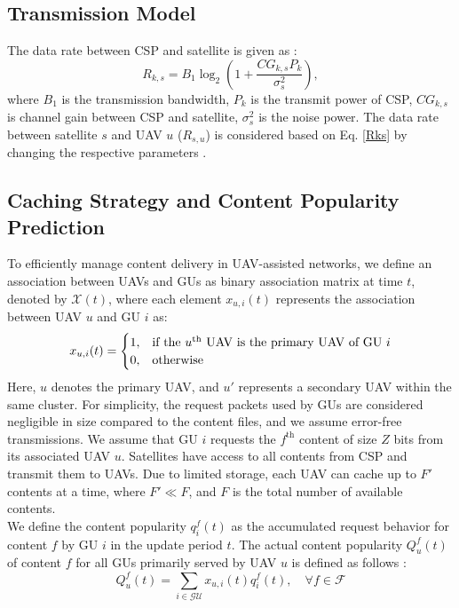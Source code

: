 \documentclass[journal]{IEEEtran}
\begin{document}
\subsection{Transmission Model}
The data rate between CSP and satellite is given as \cite{10297374}:
\begin{equation}
    R_{k,s} = B_1 \log_2\left(1 + \frac{CG_{k,s}P_{k}}{\sigma^2_s}\right), \label{Rks}
\end{equation}
where $B_1$ is the transmission bandwidth, $P_{k}$ is the transmit power of CSP, $CG_{k,s}$ is channel gain between CSP and satellite, $\sigma^2_s$ is the noise power.
The data rate between satellite $s$ and UAV $u$ ($R_{s,u}$)
is considered based on Eq. \eqref{Rks} by changing the respective parameters \cite{10297374}.

\subsection{Caching Strategy and Content Popularity Prediction}

To efficiently manage content delivery in UAV-assisted networks, we define an association between UAVs and GUs as binary association matrix at time $t$, denoted by \textbf{$\mathcal{X}(t)$},  where each element \( x_{u,i}(t) \) represents the association  between UAV \( u \) and GU \( i \) as:
\begin{equation}
\small
x_{u,i}(t) = 
\begin{cases}
1, & \text{if the $u^{\text{th}}$ UAV is the primary UAV of GU $i$} \\
0, & \text{otherwise}
\end{cases}
\end{equation}
Here, $u$ denotes the primary UAV, and $u'$ represents a secondary UAV within the same cluster. For simplicity, the request packets used by GUs are considered negligible in size compared to the content files, and we assume error-free transmissions.
We assume that GU \( i \) requests the \( f^{\text{th}} \) content of size \( Z \) bits from its associated UAV \( u \). Satellites have access to all contents from CSP and transmit them to UAVs. Due to limited storage, each UAV can cache up to \( F' \) contents at a time, where \( F' \ll F \), and \( F \) is the total number of available contents.\\
We define the content popularity \( q_{i}^{f}(t) \) as the accumulated request behavior for content \( f \) by GU \( i \) in the update period \( t \). The actual content popularity \( Q^{f}_{u}(t) \)  of content $f$ for all GUs primarily served by UAV \( u \) is defined as follows \cite{9215049}:
\begin{equation}
Q^{f}_{u}(t) = \sum_{i \in \mathcal{GU}} x_{u,i}(t) q_{i}^{f}(t), \quad \forall f \in \mathcal{F}
\label{accumulate_request}
\end{equation}
\end{document}
